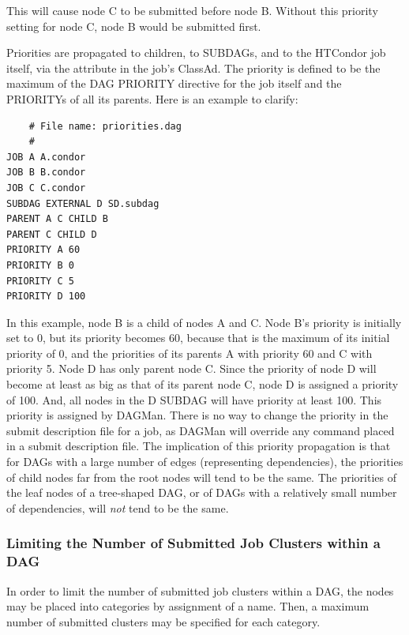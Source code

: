 This will cause node C to be submitted before node B.
Without this priority setting for node C, node B would be submitted first.

Priorities are propagated to children, to SUBDAGs, 
and to the HTCondor job itself,
via the  attribute in the job's ClassAd. 
The priority is defined to be the maximum of the DAG PRIORITY directive 
for the job itself and the PRIORITYs of all its parents. 
Here is an example to clarify:

\footnotesize
\begin{verbatim}
    # File name: priorities.dag
    #
JOB A A.condor
JOB B B.condor
JOB C C.condor
SUBDAG EXTERNAL D SD.subdag
PARENT A C CHILD B
PARENT C CHILD D
PRIORITY A 60
PRIORITY B 0
PRIORITY C 5
PRIORITY D 100
\end{verbatim}
\normalsize

In this example, node B is a child of nodes A and C. 
Node B's priority is initially set to 0,
but its priority becomes 60,
because that is the maximum of its initial priority of 0,
and the priorities of its parents
A with priority 60 and C with priority 5.
Node D has only parent node C.
Since the priority of node D will become at least as big as that of 
its parent node C,
node D is assigned a priority of 100.
And, all nodes in the D SUBDAG will have priority at least 100.
This priority is assigned by DAGMan.
There is no way to change the priority in the submit description file for a job,
as DAGMan will override any  command placed
in a submit description file.
The implication of this priority propagation is
that for DAGs with a large number of edges (representing dependencies), 
the priorities of child nodes far from the root nodes 
will tend to be the same.
The priorities of the leaf nodes of a tree-shaped DAG,
or of DAGs with a relatively small number of dependencies,
will \emph{not} tend to be the same.

\subsubsection{\label{sec:DAG-node-category}Limiting the Number of Submitted Job Clusters within a DAG}


In order to limit the number of submitted job clusters within a DAG,
the nodes may be placed into categories by assignment of a name.
Then, a maximum number of submitted clusters may be specified
for each category.

